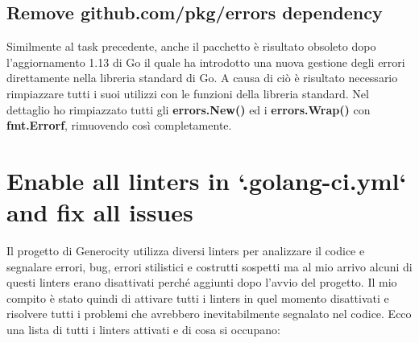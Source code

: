 \documentclass[main.tex]{subfiles}
\begin{document}
\subsection{Remove github.com/pkg/errors dependency}
Similmente al task precedente, anche il pacchetto  è risultato obsoleto dopo l'aggiornamento 1.13 \cite{Go113} di Go il quale ha introdotto una nuova gestione degli errori direttamente nella libreria standard di Go. A causa di ciò è risultato necessario rimpiazzare tutti i suoi utilizzi con le funzioni della libreria standard. \newline
Nel dettaglio ho rimpiazzato tutti gli \textbf{errors.New()} ed i \textbf{errors.Wrap()} con \textbf{fmt.Errorf}, rimuovendo così  completamente.

\section{Enable all linters in `.golang-ci.yml` and fix all issues}
Il progetto di Generocity utilizza diversi linters 
\cite{Linters} per analizzare il codice e segnalare errori, bug, errori stilistici e costrutti sospetti ma al mio arrivo alcuni di questi linters erano disattivati perché aggiunti dopo l'avvio del progetto. Il mio compito è stato quindi di attivare tutti i linters in quel momento disattivati e risolvere tutti i problemi che avrebbero inevitabilmente segnalato nel codice. \newline
Ecco una lista di tutti i linters attivati e di cosa si occupano: 
\end{document}

